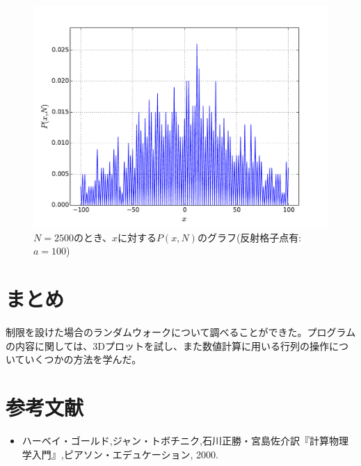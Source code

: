 \documentclass{jsarticle}
\begin{document}
\begin{enumerate}
\begin{enumerate}
                    
                    \begin{figure}[H]
                        \begin{center}
                        \includegraphics[width=12.5cm]{figure_7.pdf}
                        \caption{$N=2500$のとき、$x$に対する$P(x,N)$のグラフ(反射格子点有:$a=100$)}
                        \label{fig:7}
                    \end{center}
                    \end{figure}
                    
                    
                \end{enumerate} 
            
        \end{enumerate}
    
    \section{まとめ}
    
        制限を設けた場合のランダムウォークについて調べることができた。プログラムの内容に関しては、3Dプロットを試し、また数値計算に用いる行列の操作についていくつかの方法を学んだ。
    

    \section{参考文献}
    
        \begin{itemize}
            \item ハーベイ・ゴールド,ジャン・トボチニク,石川正勝・宮島佐介訳『計算物理学入門』,ピアソン・エデュケーション, 2000.
        \end{itemize}
\end{document}
